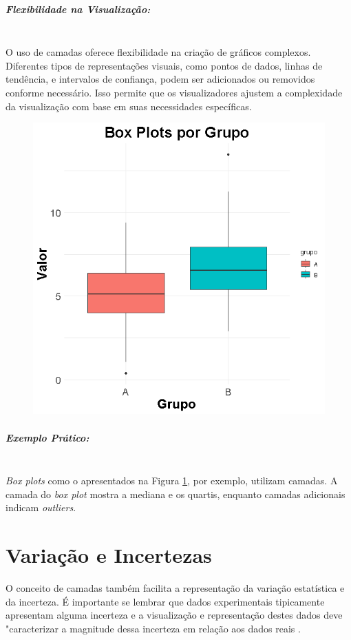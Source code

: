\documentclass[article]{memoir}
\let\section\chapter    %
\begin{document}
\paragraph*{Flexibilidade na Visualização:}\mbox{}\\
O uso de camadas oferece flexibilidade na criação de gráficos complexos. Diferentes tipos de representações visuais, como pontos de dados, linhas de tendência, e intervalos de confiança, podem ser adicionados ou removidos conforme necessário. Isso permite que os visualizadores ajustem a complexidade da visualização com base em suas necessidades específicas.

\begin{figure}[ht]
	\centering
	\includegraphics[width=0.5\linewidth]{figs/layers_box_plt_example}
	\caption{}
	\label{fig:layersboxpltexample}
\end{figure}


\paragraph*{Exemplo Prático:}\mbox{}\\
 \textit{Box plots} como o apresentados na Figura 	\ref{fig:layersboxpltexample}, por exemplo, utilizam camadas. A camada do \textit{box plot} mostra a mediana e os quartis, enquanto camadas adicionais indicam \textit{outliers}.


	
\section{Variação e Incertezas}


O conceito de camadas também facilita a representação da variação estatística e da incerteza. É importante se lembrar que dados experimentais tipicamente apresentam alguma incerteza  e a visualização e representação destes dados deve "caracterizar a magnitude dessa incerteza em relação aos dados reais  \cite{wainer1996depicting}. 
\end{document}
